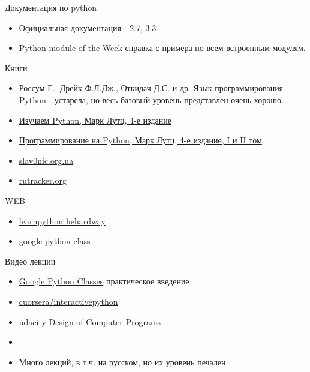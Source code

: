 \documentclass{article}
\begin{document}
\LARGE

\begin{center} Документация по python \end{center}
\begin{itemize}
	\item Официальная документация - \href{http://docs.python.org/2.7/}{2.7}, 
			\href{http://docs.python.org/3.3/}{3.3}
	\item \href{http://www.doughellmann.com/PyMOTW/}{Python module of the Week} 
		  справка с примера по всем встроенным модулям.
\end{itemize}

\begin{center} Книги \end{center}
\begin{itemize}
	\item Россум Г., Дрейк Ф.Л.Дж., Откидач Д.С. и др. Язык программирования Python 
	    - устарела, но весь базовый уровень представлен очень хорошо.
	\item \href{http://rutracker.org/forum/viewtopic.php?t=4130425}{Изучаем Python, Марк Лутц, 4-е издание}
	\item \href{http://rutracker.org/forum/viewtopic.php?t=3958297}{Программирование на Python, Марк Лутц, 4-е издание, I и II том}
    \item \href{http://slav0nic.org.ua/static/books/python/}{slav0nic.org.ua}
    \item \href{http://rutracker.org/forum/viewtopic.php?t=2436308}{rutracker.org}
\end{itemize}

\begin{center} WEB \end{center}
\begin{itemize} 
	\item \href{http://learnpythonthehardway.org/}{learnpythonthehardway}
	\item \href{http://code.google.com/edu/languages/google-python-class/}{google-python-class}
\end{itemize}

\begin{center} Видео лекции \end{center}
\begin{itemize}
	\item \href{http://www.youtube.com/results?search_query=Google+Python+Class}{Google Python Classes} 
	      практическое введение
	\item \href{https://class.coursera.org/interactivepython-2012-001/class/index}{cuorsera/interactivepython}
	\item \href{http://www.udacity.com/overview/Course/cs212/CourseRev/apr2012}{udacity Design of Computer Programs}
	\item 
	\item Много лекций, в т.ч. на русском, но их уровень печален.
\end{itemize}
\end{document}
